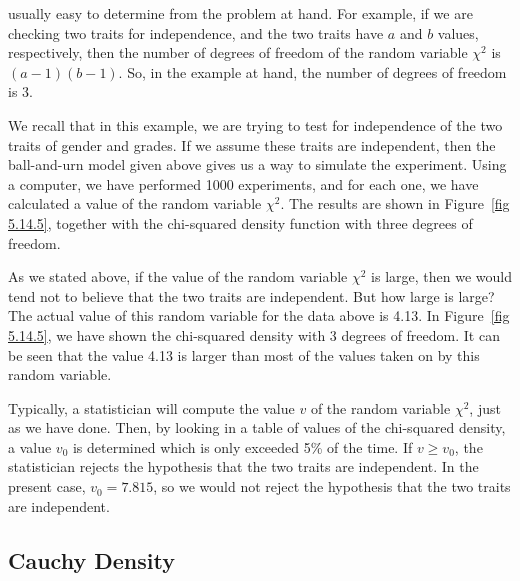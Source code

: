 \begin{example}
usually easy to determine from the problem at hand.  For example, if we are checking
two traits for independence, and the two traits have $a$ and $b$ values, respectively,
then the number of degrees of freedom of the random variable $\chi^2$ is
$(a-1)(b-1)$.  So, in the example at hand, the number of degrees of freedom is 3.
\par
We recall that in this example, we are trying to test for independence of the two traits of
gender and grades.  If we assume these traits are independent, then the ball-and-urn model
given above gives us a way to simulate the experiment.  Using a computer, we have performed
1000 experiments, and for each one, we have calculated a value of the random variable
$\chi^2$.  The results are shown in Figure~\ref{fig 5.14.5}, together with the 
chi-squared density function with three degrees of freedom.
\par
As we stated above, if the value of the random variable $\chi^2$ is large, then we
would tend not to believe that the two traits are independent.  But how large is
large?  The actual value of this random variable for the data above is 4.13.  In
Figure~\ref{fig 5.14.5}, we have shown the chi-squared density with 3 degrees of freedom. 
It can be seen that the value 4.13 is larger than most of the values taken on by this
random variable.  

\par
Typically, a statistician will compute the value $v$ of the random variable $\chi^2$,
just as we have done.  Then, by looking in a table of values of the chi-squared density, a value
$v_0$ is determined which is only exceeded 5\% of the time.  If $v \ge v_0$, the statistician
rejects the hypothesis that the two traits are independent.  In the present case, $v_0 = 7.815$, so
we would not reject the hypothesis that the two traits are independent.
\end{example}

\subsection*{Cauchy Density}
 
